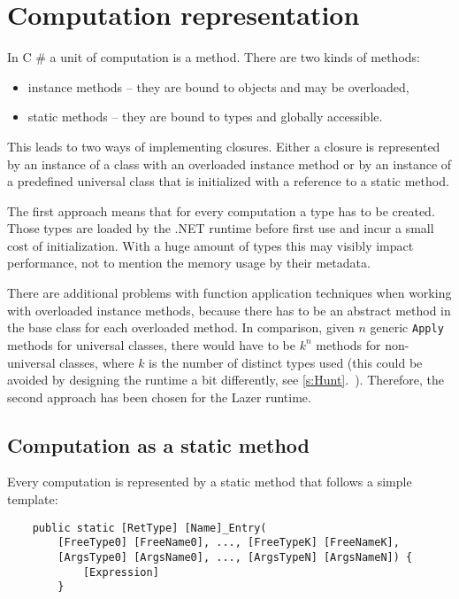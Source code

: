 \documentclass[en]{pracamgr}
\newcommand{\shrp}{%
  {\fontfamily{ppl}\selectfont\#%
  }}
\newcommand{\myref}[1]{\ref{#1}.~\textit{\nameref{#1}}}
\begin{document}
\section{Computation representation}\label{s:computations}

In C\shrp{} a unit of computation is a method.
There are two kinds of methods:
\begin{itemize}
    \item instance methods -- they are bound to objects and may be overloaded,
    \item static methods -- they are bound to types and globally accessible.
\end{itemize}
This leads to two ways of implementing closures.
Either a closure is represented by an instance of a class with an
overloaded instance method or by an instance of a predefined universal
class that is initialized with a reference to a static method.

The first approach means that for every computation a type has to be created.
Those types are loaded by the .NET runtime before first use and incur a small
cost of initialization. With a huge amount of types this may visibly impact performance,
not to mention the memory usage by their metadata.

There are additional problems with function application techniques
when working with overloaded instance methods,
because there has to be an abstract method in the
base class for each overloaded method.
In comparison, given $n$ generic \texttt{Apply} methods for universal
classes, there would have to be $k^n$ methods
for non-universal classes, where $k$ is the number of
distinct types used (this could be avoided by
designing the runtime a bit differently, see \myref{s:Hunt}).
Therefore, the second approach has been chosen for the Lazer runtime.

\subsection{Computation as a static method}

Every computation is represented by a static method that follows a simple template:

\begin{verbatim}
    public static [RetType] [Name]_Entry(
        [FreeType0] [FreeName0], ..., [FreeTypeK] [FreeNameK],
        [ArgsType0] [ArgsName0], ..., [ArgsTypeN] [ArgsNameN]) {
            [Expression]
        }
\end{verbatim}
\end{document}
